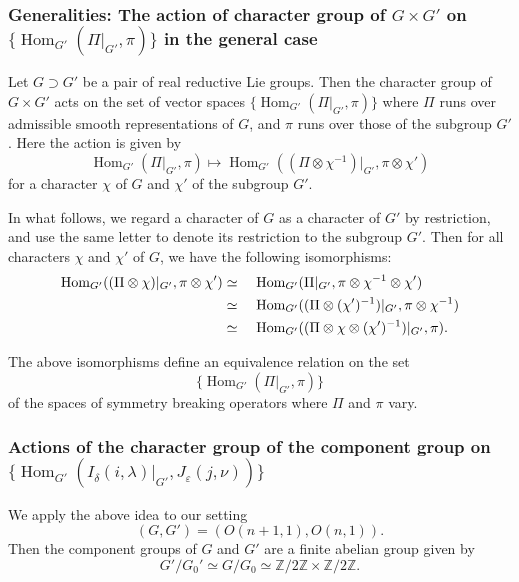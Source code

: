 \subsubsection{Generalities: The action of character group of 
 $G \times G'$ on $\{{\operatorname{Hom}}_{G'}(\Pi|_{G'}, \pi)\}$
 in the general case}
Let $G \supset G'$ be a pair of real reductive Lie groups.  
Then the character group of $G \times G'$
 acts on the set of vector spaces
 $\{{\operatorname{Hom}}_{G'}(\Pi|_{G'}, \pi)\}$
 where $\Pi$ runs over admissible smooth representations of $G$, 
 and $\pi$ runs over those of the subgroup $G'$.  
Here the action is given by 
\[
   {\operatorname{Hom}}_{G'}(\Pi|_{G'}, \pi)
   \mapsto
   {\operatorname{Hom}}_{G'}((\Pi \otimes \chi^{-1})|_{G'}, \pi \otimes \chi')
\]
for a character $\chi$ of $G$
 and $\chi'$ of the subgroup $G'$.  



In what follows, 
 we regard a character of $G$ as a character of $G'$
 by restriction,
 and use the same letter
 to denote its restriction to the subgroup $G'$.  
Then for all characters $\chi$ and $\chi'$ of $G$, 
 we have the following isomorphisms:
\begin{alignat}{2} 
\mbox{Hom}_{G'} ((\Pi\otimes \chi)|_{G'}, \pi \otimes \chi' ) 
&\simeq\,\,
&&\mbox{Hom}_{G'}(\Pi|_{G'},\pi\otimes \chi^{-1}  \otimes \chi') 
\notag
\\
&\simeq 
&&\mbox{Hom}_{G'} ((\Pi\otimes (\chi')^{-1})|_{G'}, \pi \otimes \chi^{-1}) 
\notag
\\
&\simeq 
&&\mbox{Hom}_{G'} ((\Pi\otimes \chi \otimes (\chi')^{-1})|_{G'}, \pi).
\label{eqn:314}
\end{alignat}



The above isomorphisms define an equivalence relation
 on the set 
\[
   \{{\operatorname{Hom}}_{G'}(\Pi|_{G'}, \pi)\}
\]
 of the spaces of symmetry breaking operators
 where $\Pi$ and $\pi$ vary. 



\subsubsection{Actions of the character group
 of the component group
 on 
 $\{{\operatorname{Hom}}_{G'}
  (I_{\delta}(i,\lambda)|_{G'}, J_{\varepsilon}(j,\nu))\}$}
\label{subsec:chiIilmd}
We apply the above idea to our setting
\[
  (G,G') = (O(n+1,1), O(n,1)).  
\]
Then the 
component groups of $G$ and $G'$ are a finite abelian group given by
\begin{equation}
\label{eqn:chiabrest}
   G'/G_0' \simeq G/G_0 
         \simeq {\mathbb{Z}}/2{\mathbb{Z}} \times {\mathbb{Z}}/2{\mathbb{Z}}.
\end{equation}



